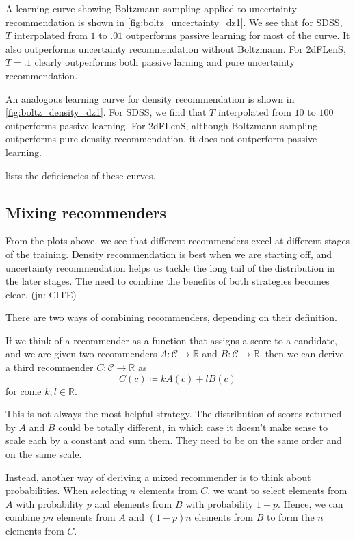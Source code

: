 \documentclass[11pt,twoside,openright]{report}
\newcommand\bbR{\mathbb{R}}
\newcommand\cC{\mathcal{C}}
\newcommand\jn[1]{{\color{red}(jn: #1)}}
\begin{document}
A learning curve showing Boltzmann sampling applied to uncertainty recommendation is shown in \cref{fig:boltz_uncertainty_dz1}. We see that for SDSS, $T$ interpolated from $1$ to $.01$ outperforms passive learning for most of the curve. It also outperforms uncertainty recommendation without Boltzmann. For 2dFLenS, $T=.1$ clearly outperforms both passive larning and pure uncertainty recommendation.

An analogous learning curve for density recommendation is shown in \cref{fig:boltz_density_dz1}. For SDSS, we find that $T$ interpolated from $10$ to $100$ outperforms passive learning. For 2dFLenS, although Boltzmann sampling outperforms pure density recommendation, it does not outperform passive learning.

 lists the deficiencies of these curves.

\subsection{Mixing recommenders}

From the plots above, we see that different recommenders excel at different stages of the training. Density recommendation is best when we are starting off, and uncertainty recommendation helps us tackle the long tail of the distribution in the later stages. The need to combine the benefits of both strategies becomes clear. \jn{CITE}

There are two ways of combining recommenders, depending on their definition.

If we think of a recommender as a function that assigns a score to a candidate, and we are given two recommenders $A : \cC \to \bbR$ and $B : \cC \to \bbR$, then we can derive a third recommender $C : \cC \to \bbR$ as \[
    C(c) \coloneqq kA(c) + lB(c)
\] for come $k, l \in \bbR$.

This is not always the most helpful strategy. The distribution of scores returned by $A$ and $B$ could be totally different, in which case it doesn't make sense to scale each by a constant and sum them. They need to be on the same order and on the same scale.

Instead, another way of deriving a mixed recommender is to think about probabilities. When selecting $n$ elements from $C$, we want to select elements from $A$ with probability $p$ and elements from $B$ with probability $1-p$. Hence, we can combine $pn$ elements from $A$ and $(1-p)n$ elements from $B$ to form the $n$ elements from $C$.
\end{document}
